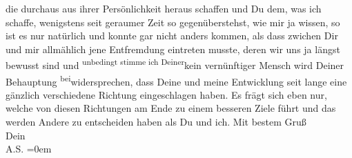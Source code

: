 \begin{ledgroupsized}[t]{13cm}
               die  durchaus aus ihrer Persönlichkeit heraus schaffen und Du dem, was
               ich schaffe, \introOben{}wenigstens seit geraumer Zeit\introOben{} so
               gegenüberstehst, wie mir ja wissen, so ist es nur natürlich und konnte gar nicht
               anders kommen, als dass zwichen Dir und mir allmählich {\pb}jene Entfremdung eintreten musste,
               deren wir uns ja längst bewusst sind und \substVorne{}\textsuperscript{unbedingt stimme ich Deiner}{\allowbreak}\substDazwischen{}kein vernünftiger Mensch wird Deiner\substHinten{} Behauptung \substVorne{}\textsuperscript{bei}\substDazwischen{}widersprechen\substHinten{}, dass Deine und meine Entwicklung seit lange eine gänzlich verschiedene
               Richtung eingeschlagen haben. Es frägt sich eben nur, welche von diesen Richtungen am
               Ende zu einem besseren Ziele führt und das werden Andere zu entscheiden haben als Du
               und ich.\pend
           \pstart
           Mit bestem Gruß {\\[\baselineskip]}Dein {\\[\baselineskip]}\spacefill\mbox{A.S.}\pend
           \leftskip=0em{}
         
         \endnumbering{}\end{ledgroupsized}\begin{anhang}\end{anhang}\newcommand{\dateiname}{L03521}\newcommand{\titel}{Arthur Schnitzler an Paul Goldmann, 1. 2. 1911}\newcommand{\editorInnen}{Martin Anton Müller und Laura Untner}
      